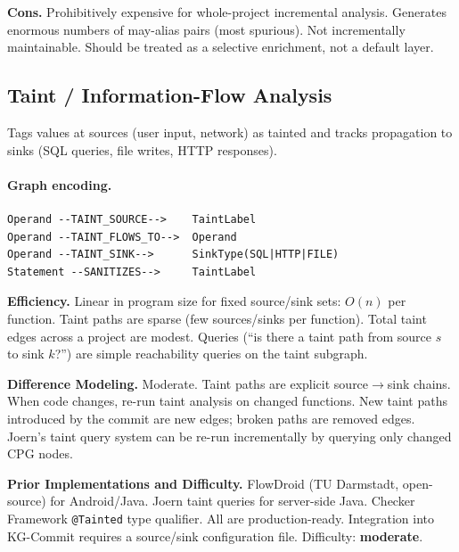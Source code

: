 \documentclass[12pt,a4paper]{article}
\begin{document}
\begin{consbox}
\textbf{Cons.}
Prohibitively expensive for whole-project incremental analysis. Generates
enormous numbers of may-alias pairs (most spurious). Not incrementally
maintainable. Should be treated as a selective enrichment, not a default layer.
\end{consbox}

\subsection{Taint / Information-Flow Analysis}

Tags values at sources (user input, network) as tainted and tracks propagation
to sinks (SQL queries, file writes, HTTP responses).

\paragraph{Graph encoding.}
\begin{lstlisting}
Operand --TAINT_SOURCE-->    TaintLabel
Operand --TAINT_FLOWS_TO-->  Operand
Operand --TAINT_SINK-->      SinkType(SQL|HTTP|FILE)
Statement --SANITIZES-->     TaintLabel
\end{lstlisting}

\begin{effbox}
\textbf{Efficiency.}
Linear in program size for fixed source/sink sets: $O(n)$ per function.
Taint paths are sparse (few sources/sinks per function). Total taint edges
across a project are modest. Queries (``is there a taint path from source $s$
to sink $k$?'') are simple reachability queries on the taint subgraph.
\end{effbox}

\begin{diffbox}
\textbf{Difference Modeling.}
Moderate. Taint paths are explicit source$\to$sink chains. When code changes,
re-run taint analysis on changed functions. New taint paths introduced by the
commit are new edges; broken paths are removed edges. Joern's taint query
system can be re-run incrementally by querying only changed CPG nodes.
\end{diffbox}

\begin{implbox}
\textbf{Prior Implementations and Difficulty.}
FlowDroid (TU Darmstadt, open-source) for Android/Java. Joern taint queries
for server-side Java. Checker Framework \texttt{@Tainted} type qualifier.
All are production-ready. Integration into KG-Commit requires a source/sink
configuration file. Difficulty: \textbf{moderate}.
\end{implbox}
\end{document}
